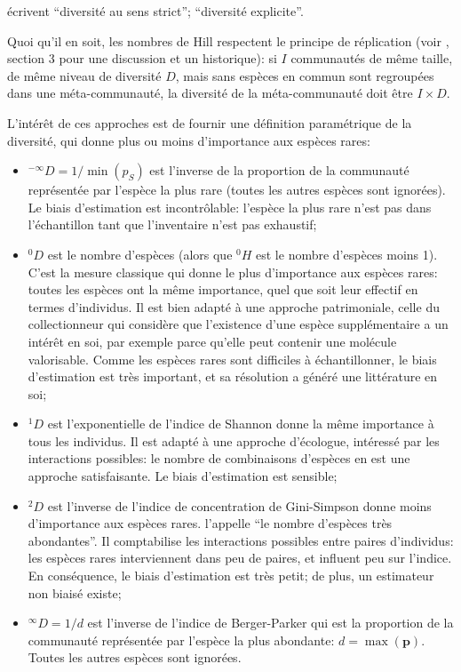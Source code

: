 \documentclass[
  11pt,
  french,
  a4paper,
  extrafontsizes,onecolumn,openright
  ]{memoir}
\providecommand{\tightlist}{%
  \setlength{\itemsep}{0pt}\setlength{\parskip}{0pt}}
\begin{document}
\textcite{Dauby2012} écrivent ``diversité au sens strict''; \textcite{Gregorius2010} ``diversité explicite''.

Quoi qu'il en soit, les nombres de Hill respectent le principe de réplication (voir \textcite{Chao2010}, section 3 pour une discussion et un historique): si \(I\) communautés de même taille, de même niveau de diversité \(D\), mais sans espèces en commun sont regroupées dans une méta-communauté, la diversité de la méta-communauté doit être \(I\times D\).

L'intérêt de ces approches est de fournir une définition paramétrique de la diversité, qui donne plus ou moins d'importance aux espèces rares:

\begin{itemize}
\tightlist
\item
  \(^{-\infty}\!D={1}/{\min(p_S)}\) est l'inverse de la proportion de la communauté représentée par l'espèce la plus rare (toutes les autres espèces sont ignorées).
  Le biais d'estimation est incontrôlable: l'espèce la plus rare n'est pas dans l'échantillon tant que l'inventaire n'est pas exhaustif;
\item
  \(^{0}\!D\) est le nombre d'espèces (alors que \(^{0}\!H\) est le nombre d'espèces moins 1). C'est la mesure classique qui donne le plus d'importance aux espèces rares: toutes les espèces ont la même importance, quel que soit leur effectif en termes d'individus.
  Il est bien adapté à une approche patrimoniale, celle du collectionneur qui considère que l'existence d'une espèce supplémentaire a un intérêt en soi, par exemple parce qu'elle peut contenir une molécule valorisable.
  Comme les espèces rares sont difficiles à échantillonner, le biais d'estimation est très important, et sa résolution a généré une littérature en soi;
\item
  \(^{1}\!D\) est l'exponentielle de l'indice de Shannon donne la même importance à tous les individus.
  Il est adapté à une approche d'écologue, intéressé par les interactions possibles: le nombre de combinaisons d'espèces en est une approche satisfaisante.
  Le biais d'estimation est sensible;
\item
  \(^{2}\!D\) est l'inverse de l'indice de concentration de Gini-Simpson donne moins d'importance aux espèces rares.
  \textcite{Hill1973} l'appelle ``le nombre d'espèces très abondantes''.
  Il comptabilise les interactions possibles entre paires d'individus: les espèces rares interviennent dans peu de paires, et influent peu sur l'indice.
  En conséquence, le biais d'estimation est très petit; de plus, un estimateur non biaisé existe;
\item
  \(^{\infty}\!D={1}/{d}\) est l'inverse de l'indice de Berger-Parker \autocite{Berger1970} qui est la proportion de la communauté représentée par l'espèce la plus abondante: \(d=\max(\mathbf{p})\).
  Toutes les autres espèces sont ignorées.
\end{itemize}
\end{document}
